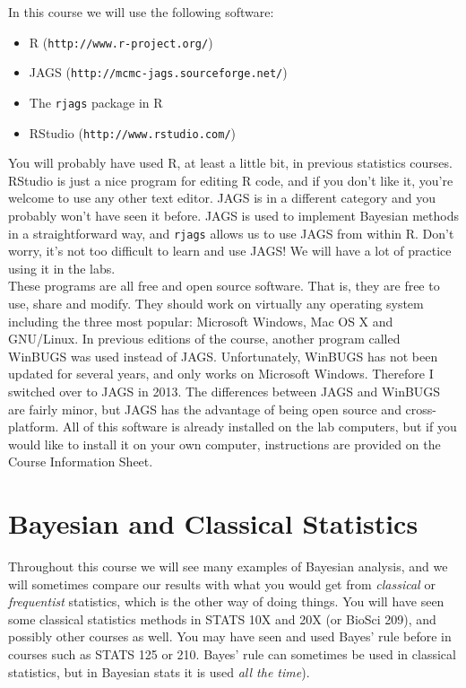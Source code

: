 In this course we will use the following software:
\begin{itemize}
\item R ({\tt http://www.r-project.org/})
\item JAGS ({\tt http://mcmc-jags.sourceforge.net/})
\item The {\tt rjags} package in R
\item RStudio ({\tt http://www.rstudio.com/})
\end{itemize}
You will probably have used R, at least a little bit, in previous statistics
courses. RStudio is just a nice program for editing R code, and if you
don't like it, you're welcome to use any other text editor. JAGS is in a
different category and you probably won't have seen it before. JAGS is used to
implement Bayesian methods in a straightforward way, and {\tt rjags} allows us
to use JAGS from within R.
Don't worry, it's not too difficult to learn and use JAGS! We will have a lot of
practice using it in the labs.\\

These programs are all free and open source software.
That is, they are free to use, share and modify. They should work on
virtually any operating system including the three most popular:
Microsoft Windows, Mac OS X and GNU/Linux. In previous editions of the course,
another program called WinBUGS was used instead of JAGS.
Unfortunately, WinBUGS has not been updated for
several years, and only works on Microsoft Windows. Therefore I switched over
to JAGS in 2013. The differences between JAGS and WinBUGS
are fairly minor, but JAGS has the advantage of being open source and
cross-platform. All of this software is already installed on the lab computers,
but if you would like to install it on your own computer, instructions are
provided on the Course Information Sheet.\\

\section{Bayesian and Classical Statistics}
Throughout this course we will see many examples of Bayesian analysis, and we
will sometimes compare our results with what you would get from
{\it classical} or {\it frequentist} statistics, which is the other way of
doing things. You will have seen some classical statistics methods in STATS
10X and 20X (or BioSci 209), and possibly other courses as well.
You may have seen and used Bayes' rule before in courses such as STATS 125
or 210. Bayes' rule can sometimes be used in classical statistics, but in
Bayesian stats it is used {\it all the time}).\\

